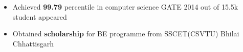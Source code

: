 \\[-0.9cm]\\
\begin{itemize}
	\item Achieved \textbf{99.79} percentile in computer science GATE 2014 out of 15.5k student appeared\\[-0.6 cm]
	\item Obtained \textbf{scholarship} for BE programme from SSCET(CSVTU) Bhilai Chhattisgarh\\[-0.5 cm]
\end{itemize}
